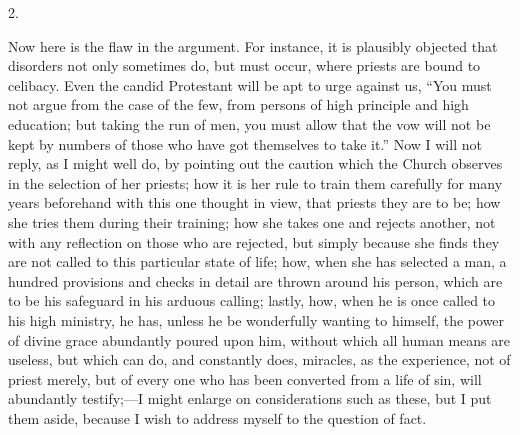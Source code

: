 2.

Now here is the flaw in the argument. For instance, it
is plausibly objected that disorders not only sometimes
do, but must occur, where priests are bound to celibacy.
Even the candid Protestant will be apt to urge against
us, ``You must not argue from the case of the few,
from persons of high principle and high education; but
taking the run of men, you must allow that the vow will
not be kept by numbers of those who have got themselves
to take it.'' Now I will not reply, as I might well
do, by pointing out the caution which the Church observes
in the selection of her priests; how it is her rule to
train them carefully for many years beforehand with this
one thought in view, that priests they are to be; how she
tries them during their training; how she takes one and
rejects another, not with any reflection on those who are
rejected, but simply because she finds they are not
called to this particular state of life; how, when she
has selected a man, a hundred provisions and checks in
detail are thrown around his person, which are to be his
safeguard in his arduous calling; lastly, how, when he is
once called to his high ministry, he has, unless he be
wonderfully wanting to himself, the power of divine grace
abundantly poured upon him, without which all human means
are useless, but which can do, and constantly does,
miracles, as the experience, not of priest merely, but of
every one who has been converted from a life of sin, will
abundantly testify;—I might enlarge on
considerations such as these, but I put them aside,
because I wish to address myself to the question of fact.

